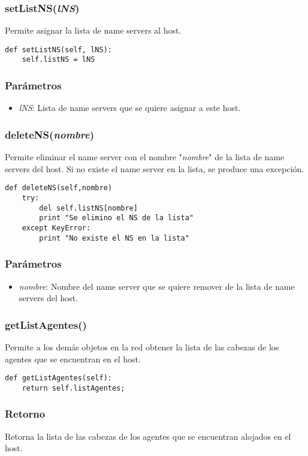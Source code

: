 \documentclass{article}
\begin{document}
\subsubsection{\textbf{setListNS}(\textit{lNS})}
Permite asignar la lista de name servers al host.
\begin{lstlisting}
def setListNS(self, lNS):
	self.listNS = lNS
\end{lstlisting}
\subsubsection*{Parámetros}
\begin{itemize}
\item \textit{lNS}: Lista de name servers que se quiere asignar a este host.
\end{itemize}
\subsubsection{\textbf{deleteNS}(\textit{nombre})}
Permite eliminar el name server con el nombre "\textit{nombre}" de la lista de name servers del host. Si no existe el name server en la lista, se produce una excepción.
\begin{lstlisting}
def deleteNS(self,nombre)
	try:
		del self.listNS[nombre]
		print "Se elimino el NS de la lista"
	except KeyError:
		print "No existe el NS en la lista"
\end{lstlisting}
\subsubsection*{Parámetros}
\begin{itemize}
\item \textit{nombre}: Nombre del name server que se quiere remover de la lista de name servers del host.
\end{itemize}
\subsubsection{\textbf{getListAgentes}()}
Permite a los demás objetos en la red obtener la lista de las cabezas de los agentes que se encuentran en el host.
\begin{lstlisting}
def getListAgentes(self):
	return self.listAgentes;
\end{lstlisting}
\subsubsection*{Retorno}
Retorna la lista de las cabezas de los agentes que se encuentran alojados en el host.
\end{document}
